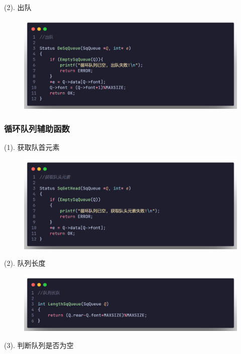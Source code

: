 (2). 出队

\begin{figure}[H]
    \centering
    \includegraphics[scale=0.2]{"figure/Note/Stack/QDq.png"}
\end{figure}

\subsubsection{循环队列辅助函数}
(1). 获取队首元素

\begin{figure}[H]
    \centering
    \includegraphics[scale=0.2]{"figure/Note/Stack/QG.png"}
\end{figure}

(2). 队列长度

\begin{figure}[H]
    \centering
    \includegraphics[scale=0.2]{"figure/Note/Stack/QLen.png"}
\end{figure}

(3). 判断队列是否为空

